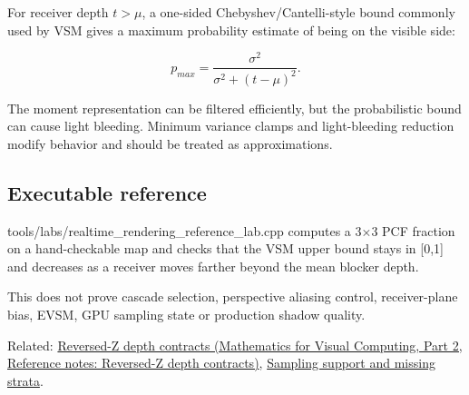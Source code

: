 For receiver depth \(t>\mu\), a one-sided Chebyshev/Cantelli-style bound commonly used by VSM gives a maximum probability estimate of being on the visible side:

\[
p_{max}
=
\frac{\sigma^2}
{\sigma^2+(t-\mu)^2}.
\]

The moment representation can be filtered efficiently, but the probabilistic bound can cause light bleeding. Minimum variance clamps and light-bleeding reduction modify behavior and should be treated as approximations.

\subsection{Executable reference}\label{appendix-7cac8a689849-executable-reference}

\hypertarget{appendix-7cac8a689849-executable-reference}{}

tools/labs/realtime\_rendering\_reference\_lab.cpp computes a 3×3 PCF fraction on a hand-checkable map and checks that the VSM upper bound stays in {[}0,1{]} and decreases as a receiver moves farther beyond the mean blocker depth.

This does not prove cascade selection, perspective aliasing control, receiver-plane bias, EVSM, GPU sampling state or production shadow quality.

Related: \href{../02-Mathematics-for-Visual-Computing-P02/main.pdf\#nameddest=appendix-275ec8847057}{Reversed-Z depth contracts (Mathematics for Visual Computing, Part 2, Reference notes: Reversed-Z depth contracts)}, \hyperref[appendix-10308c3d753e]{Sampling support and missing strata}.
